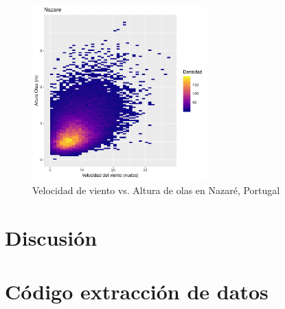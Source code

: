 \begin{figure}[!ht]
\label{fig:wind_waves_nazare}
\centering
\includegraphics[width=0.6\textwidth]{./figures/nazare.pdf}
  \caption{Velocidad de viento vs. Altura de olas en Nazaré, Portugal}
\end{figure}



\section{Discusión}%
\label{sec:discusión}


\pagebreak
\appendix

\section{Código extracción de datos}%
\label{sec:codigo_extraccion_de_datos}





